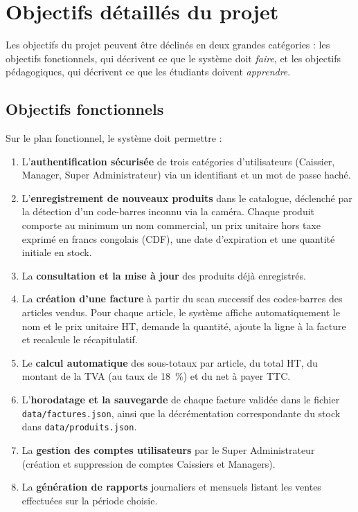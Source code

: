 \documentclass[12pt,a4paper]{article}
\begin{document}
\section{Objectifs détaillés du projet}
\label{sec:objectifs}

Les objectifs du projet peuvent être déclinés en deux grandes catégories : les objectifs fonctionnels, qui décrivent ce que le système doit \textit{faire}, et les objectifs pédagogiques, qui décrivent ce que les étudiants doivent \textit{apprendre}.

\subsection{Objectifs fonctionnels}

Sur le plan fonctionnel, le système doit permettre :

\begin{enumerate}[leftmargin=1.5em]
    \item L'\textbf{authentification sécurisée} de trois catégories d'utilisateurs (Caissier, Manager, Super Administrateur) via un identifiant et un mot de passe haché.
    \item L'\textbf{enregistrement de nouveaux produits} dans le catalogue, déclenché par la détection d'un code-barres inconnu via la caméra. Chaque produit comporte au minimum un nom commercial, un prix unitaire hors taxe exprimé en francs congolais (CDF), une date d'expiration et une quantité initiale en stock.
    \item La \textbf{consultation et la mise à jour} des produits déjà enregistrés.
    \item La \textbf{création d'une facture} à partir du scan successif des codes-barres des articles vendus. Pour chaque article, le système affiche automatiquement le nom et le prix unitaire HT, demande la quantité, ajoute la ligne à la facture et recalcule le récapitulatif.
    \item Le \textbf{calcul automatique} des sous-totaux par article, du total HT, du montant de la TVA (au taux de 18~\%) et du net à payer TTC.
    \item L'\textbf{horodatage et la sauvegarde} de chaque facture validée dans le fichier \texttt{data/factures.json}, ainsi que la décrémentation correspondante du stock dans \texttt{data/produits.json}.
    \item La \textbf{gestion des comptes utilisateurs} par le Super Administrateur (création et suppression de comptes Caissiers et Managers).
    \item La \textbf{génération de rapports} journaliers et mensuels listant les ventes effectuées sur la période choisie.
\end{enumerate}
\end{document}
